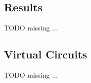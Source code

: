 
\subsection{Results}
    \colorbox{BurntOrange}{TODO missing ...}


\subsection{Virtual Circuits}
    \colorbox{BurntOrange}{TODO missing ...}
